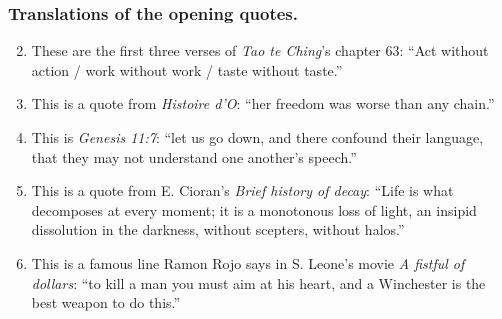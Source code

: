 \documentclass[a4paper,10pt]{amsart}
\begin{document}
\hrulefill
\subsubsection*{Translations of the opening quotes.}
\footnotesize
\begin{enumerate}[label=\S\arabic*.)]
 \setcounter{enumi}{1}
 \item These are the first three verses of \emph{Tao te Ching}'s chapter 63: ``Act without action / work without work / taste without taste.''
 \item This is a quote from \emph{Histoire d'O}: ``her freedom was worse than any chain.''
 \item This is \emph{Genesis 11:7}: ``let us go down, and there confound their language, that they may not understand one another's speech.''
 \setcounter{enumi}{5}
 \item This is a quote from E. Cioran's \emph{Brief history of decay}: ``Life is what decomposes at every moment; it is a monotonous loss of light, an insipid dissolution in the darkness, without scepters, without halos.''
 \item This is a famous line Ramon Rojo says in S. Leone's movie \emph{A fistful of dollars}: ``to kill a man you must aim at his heart, and a Winchester is the best weapon to do this.''
\end{enumerate}



\end{document}
